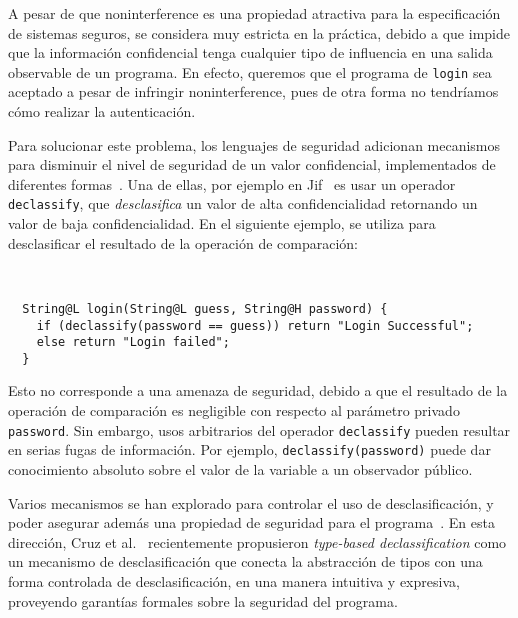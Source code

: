 A pesar de que noninterference es una propiedad atractiva para la especificación de sistemas seguros, se considera muy estricta en la práctica, debido a que impide que la información confidencial tenga cualquier tipo de influencia en una salida observable de un programa. En efecto, queremos que el programa de \texttt{login} sea aceptado a pesar de infringir noninterference, pues de otra forma no tendríamos cómo realizar la autenticación.

Para solucionar este problema, los lenguajes de seguridad adicionan mecanismos para disminuir el nivel de seguridad de un valor confidencial, implementados de diferentes formas~\cite{sabelfeldSands:JCS09}. Una de ellas, por ejemplo en Jif~\cite{jif} es usar un operador \texttt{declassify}, que \emph{desclasifica} un valor de alta confidencialidad retornando un valor de baja confidencialidad. En el siguiente ejemplo, se utiliza para desclasificar el resultado de la operación de comparación:

\begin{ej} \ \\
  \normalfont
  \label{ej2-2}
\begin{lstlisting}
  String@L login(String@L guess, String@H password) {
    if (declassify(password == guess)) return "Login Successful";
    else return "Login failed";
  }
\end{lstlisting}
\end{ej}



Esto no corresponde a una amenaza de seguridad, debido a que el resultado de la operación de comparación es negligible con respecto al parámetro privado \texttt{password}. Sin embargo, usos arbitrarios del operador \texttt{declassify} pueden resultar en serias fugas de información. Por ejemplo, \texttt{declassify(password)} puede dar conocimiento absoluto sobre el valor de la variable a un observador público.

Varios mecanismos se han explorado para controlar el uso de desclasificación, y poder asegurar además una propiedad de seguridad para el programa~\cite{sabelfeldSands:JCS09}. En esta dirección, Cruz et al.~\cite{cruzAl:ecoop2017} recientemente propusieron \emph{type-based declassification} como un mecanismo de desclasificación que conecta la abstracción de tipos con una forma controlada de desclasificación, en una manera intuitiva y expresiva, proveyendo garantías formales sobre la seguridad del programa.

